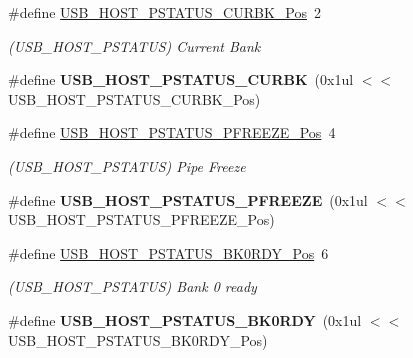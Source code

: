 \begin{DoxyCompactItemize}
\item 
\hypertarget{group___s_a_m_l21___u_s_b_ga08a0b4f63249f700520bd18d25ed92ae}{}\#define \hyperlink{group___s_a_m_l21___u_s_b_ga08a0b4f63249f700520bd18d25ed92ae}{U\+S\+B\+\_\+\+H\+O\+S\+T\+\_\+\+P\+S\+T\+A\+T\+U\+S\+\_\+\+C\+U\+R\+B\+K\+\_\+\+Pos}~2\label{group___s_a_m_l21___u_s_b_ga08a0b4f63249f700520bd18d25ed92ae}

\begin{DoxyCompactList}\small\item\em (U\+S\+B\+\_\+\+H\+O\+S\+T\+\_\+\+P\+S\+T\+A\+T\+U\+S) Current Bank \end{DoxyCompactList}\item 
\hypertarget{group___s_a_m_l21___u_s_b_ga5e556065803b13ca5bbbb0d3b92f295f}{}\#define {\bfseries U\+S\+B\+\_\+\+H\+O\+S\+T\+\_\+\+P\+S\+T\+A\+T\+U\+S\+\_\+\+C\+U\+R\+B\+K}~(0x1ul $<$$<$ U\+S\+B\+\_\+\+H\+O\+S\+T\+\_\+\+P\+S\+T\+A\+T\+U\+S\+\_\+\+C\+U\+R\+B\+K\+\_\+\+Pos)\label{group___s_a_m_l21___u_s_b_ga5e556065803b13ca5bbbb0d3b92f295f}

\item 
\hypertarget{group___s_a_m_l21___u_s_b_ga79e25a4f4de62e5cc7983e573b20bf0d}{}\#define \hyperlink{group___s_a_m_l21___u_s_b_ga79e25a4f4de62e5cc7983e573b20bf0d}{U\+S\+B\+\_\+\+H\+O\+S\+T\+\_\+\+P\+S\+T\+A\+T\+U\+S\+\_\+\+P\+F\+R\+E\+E\+Z\+E\+\_\+\+Pos}~4\label{group___s_a_m_l21___u_s_b_ga79e25a4f4de62e5cc7983e573b20bf0d}

\begin{DoxyCompactList}\small\item\em (U\+S\+B\+\_\+\+H\+O\+S\+T\+\_\+\+P\+S\+T\+A\+T\+U\+S) Pipe Freeze \end{DoxyCompactList}\item 
\hypertarget{group___s_a_m_l21___u_s_b_ga145f14dad881138c0f363ed4640e1020}{}\#define {\bfseries U\+S\+B\+\_\+\+H\+O\+S\+T\+\_\+\+P\+S\+T\+A\+T\+U\+S\+\_\+\+P\+F\+R\+E\+E\+Z\+E}~(0x1ul $<$$<$ U\+S\+B\+\_\+\+H\+O\+S\+T\+\_\+\+P\+S\+T\+A\+T\+U\+S\+\_\+\+P\+F\+R\+E\+E\+Z\+E\+\_\+\+Pos)\label{group___s_a_m_l21___u_s_b_ga145f14dad881138c0f363ed4640e1020}

\item 
\hypertarget{group___s_a_m_l21___u_s_b_gaa6ea40a00ce6778d123408464b75fbaa}{}\#define \hyperlink{group___s_a_m_l21___u_s_b_gaa6ea40a00ce6778d123408464b75fbaa}{U\+S\+B\+\_\+\+H\+O\+S\+T\+\_\+\+P\+S\+T\+A\+T\+U\+S\+\_\+\+B\+K0\+R\+D\+Y\+\_\+\+Pos}~6\label{group___s_a_m_l21___u_s_b_gaa6ea40a00ce6778d123408464b75fbaa}

\begin{DoxyCompactList}\small\item\em (U\+S\+B\+\_\+\+H\+O\+S\+T\+\_\+\+P\+S\+T\+A\+T\+U\+S) Bank 0 ready \end{DoxyCompactList}\item 
\hypertarget{group___s_a_m_l21___u_s_b_ga7bbf386e384e2cb92c42e818cf09623e}{}\#define {\bfseries U\+S\+B\+\_\+\+H\+O\+S\+T\+\_\+\+P\+S\+T\+A\+T\+U\+S\+\_\+\+B\+K0\+R\+D\+Y}~(0x1ul $<$$<$ U\+S\+B\+\_\+\+H\+O\+S\+T\+\_\+\+P\+S\+T\+A\+T\+U\+S\+\_\+\+B\+K0\+R\+D\+Y\+\_\+\+Pos)\label{group___s_a_m_l21___u_s_b_ga7bbf386e384e2cb92c42e818cf09623e}


\end{DoxyCompactItemize}
